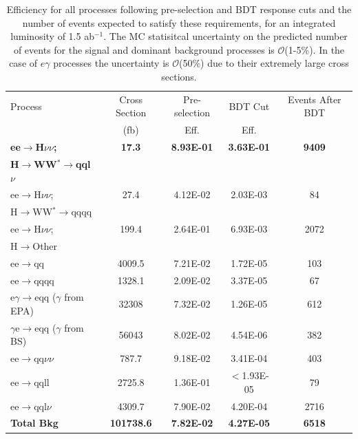\begin{table}
  \centering
  \begin{tabular}{l c c c c}
   \toprule
    Process & Cross Section & Pre-selection & BDT Cut  & Events After BDT     \\
    & (fb) & Eff. & Eff. &      \\
    \midrule
    \midrule
    \bf{ee$\rightarrow$H$\nu\nu$;}            & \bf{17.3}    &  \bf{8.93E-01}  & \bf{3.63E-01} & \bf{9409}    \\
    \bf{H$\rightarrow$WW$^*\rightarrow$qql$\nu$} & & & & \\
    \midrule
    \midrule
    ee$\rightarrow$H$\nu\nu$;  & 27.4    & 4.12E-02 & 2.03E-03 & 84  \\
    H$\rightarrow$WW$^*\rightarrow$qqqq & & & & \\
    ee$\rightarrow$H$\nu\nu$; & 199.4 & 2.64E-01 & 6.93E-03 & 2072 \\
    H$\rightarrow$Other & & & & \\
    \midrule
    \midrule
    ee$\rightarrow$qq               & 4009.5    & 7.21E-02 &  1.72E-05 & 103  \\ 
    ee$\rightarrow$qqqq               & 1328.1    &  2.09E-02 & 3.37E-05 & 67   \\ 
    e$\gamma$$\rightarrow$eqq ($\gamma$ from EPA)                 & 32308    & 7.32E-02  & 1.26E-05 & 612  \\ 
    $\gamma$e$\rightarrow$eqq ($\gamma$ from BS)               &  56043   & 8.02E-02 & 4.54E-06 & 382  \\ 
    ee$\rightarrow$qq$\nu\nu$               & 787.7    & 9.18E-02 & 3.41E-04 & 403   \\ 
    ee$\rightarrow$qqll               & 2725.8    & 1.36E-01  & $<$1.93E-05 & 79    \\ 
    ee$\rightarrow$qql$\nu$              & 4309.7    & 7.90E-02  & 4.20E-04 & 2716    \\ 
    \midrule
    \midrule
    \bf{Total Bkg}                    & \bf{101738.6} & \bf{7.82E-02} & \bf{4.27E-05} & \bf{6518} \\
    \midrule
    \bottomrule
  \end{tabular}
  \label{tab:finalHiggsResults}
  \caption[Samples Used]{Efficiency for all processes following pre-selection and BDT response cuts and the number of events expected to satisfy these requirements, for an integrated luminosity of 1.5 ab$^{-1}$. The MC statisitcal uncertainty on the predicted number of events for the signal and dominant background processes is $\mathcal{O}$(1-5\%). In the case of $e\gamma$ processes the uncertainty is $\mathcal{O}$(50\%) due to their extremely large cross sections.}
  \label{cuts}
\end{table}

